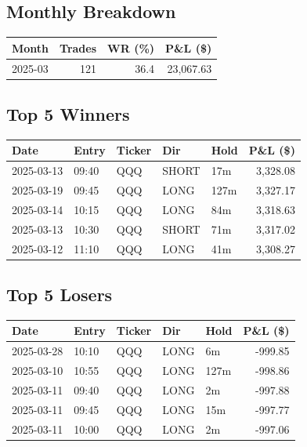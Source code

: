 \documentclass[11pt,a4paper,twoside]{article}
\begin{document}
\subsection{Monthly Breakdown}
\noindent\begin{center}
\begin{tabular}{>{\color{txtmain}}l rrr}
\toprule
\rowcolor{cardbg}
\textbf{Month} & \textbf{Trades} & \textbf{WR (\%)} & \textbf{P\&L (\$)} \\
\midrule
2025-03 & 121 & 36.4 & \textcolor{wingreen}{23,067.63} \\
\bottomrule
\end{tabular}
\end{center}
\subsection{Top 5 Winners}
\noindent\begin{center}
\begin{tabular}{>{\color{txtmain}}l llll r}
\toprule
\rowcolor{cardbg}
\textbf{Date} & \textbf{Entry} & \textbf{Ticker} & \textbf{Dir} & \textbf{Hold} & \textbf{P\&L (\$)} \\
\midrule
2025-03-13 & 09:40 & QQQ & SHORT & 17m & \textcolor{wingreen}{3,328.08} \\
2025-03-19 & 09:45 & QQQ & LONG & 127m & \textcolor{wingreen}{3,327.17} \\
2025-03-14 & 10:15 & QQQ & LONG & 84m & \textcolor{wingreen}{3,318.63} \\
2025-03-13 & 10:30 & QQQ & SHORT & 71m & \textcolor{wingreen}{3,317.02} \\
2025-03-12 & 11:10 & QQQ & LONG & 41m & \textcolor{wingreen}{3,308.27} \\
\bottomrule
\end{tabular}
\end{center}
\subsection{Top 5 Losers}
\noindent\begin{center}
\begin{tabular}{>{\color{txtmain}}l llll r}
\toprule
\rowcolor{cardbg}
\textbf{Date} & \textbf{Entry} & \textbf{Ticker} & \textbf{Dir} & \textbf{Hold} & \textbf{P\&L (\$)} \\
\midrule
2025-03-28 & 10:10 & QQQ & LONG & 6m & \textcolor{lossred}{-999.85} \\
2025-03-10 & 10:55 & QQQ & LONG & 127m & \textcolor{lossred}{-998.86} \\
2025-03-11 & 09:40 & QQQ & LONG & 2m & \textcolor{lossred}{-997.88} \\
2025-03-11 & 09:45 & QQQ & LONG & 15m & \textcolor{lossred}{-997.77} \\
2025-03-11 & 10:00 & QQQ & LONG & 2m & \textcolor{lossred}{-997.06} \\
\bottomrule
\end{tabular}
\end{center}
\clearpage
\end{document}
